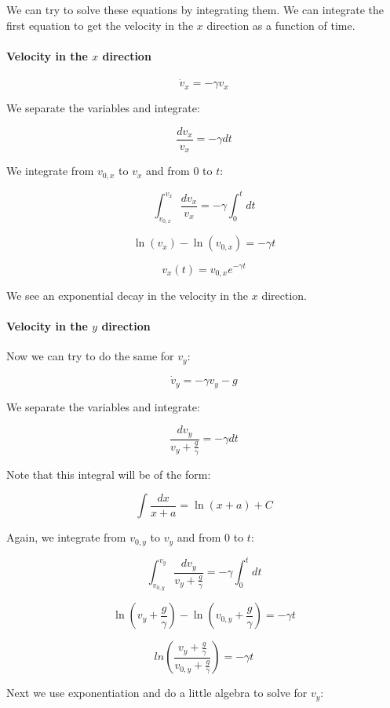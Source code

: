 \documentclass[11pt]{article}
\begin{document}
We can try to solve these equations by integrating them. We can
integrate the first equation to get the velocity in the \(x\) direction
as a function of time.

\paragraph{\texorpdfstring{Velocity in the \(x\)
direction}{Velocity in the x direction}}\label{velocity-in-the-x-direction}

\[\dot{v}_x = -\gamma v_x\]

We separate the variables and integrate:

\[\frac{dv_x}{v_x} = -\gamma dt\]

We integrate from \(v_{0,x}\) to \(v_x\) and from \(0\) to \(t\):

\[\int_{v_{0,x}}^{v_x} \frac{dv_x}{v_x} = -\gamma \int_{0}^{t} dt\]

\[\ln(v_x) - \ln(v_{0,x}) = -\gamma t\]

\[v_x(t) = v_{0,x} e^{-\gamma t}\]

We see an exponential decay in the velocity in the \(x\) direction.

\paragraph{\texorpdfstring{Velocity in the \(y\)
direction}{Velocity in the y direction}}\label{velocity-in-the-y-direction}

Now we can try to do the same for \(v_y\):

\[\dot{v}_y = -\gamma v_y - g\]

We separate the variables and integrate:

\[\frac{dv_y}{v_y + \frac{g}{\gamma}} = -\gamma dt\]

Note that this integral will be of the form:

\[\int \frac{dx}{x + a} = \ln(x + a) + C\]

Again, we integrate from \(v_{0,y}\) to \(v_y\) and from \(0\) to \(t\):

\[\int_{v_{0,y}}^{v_y} \frac{dv_y}{v_y + \frac{g}{\gamma}} = -\gamma \int_{0}^{t} dt\]

\[\ln(v_y + \frac{g}{\gamma}) - \ln(v_{0,y} + \frac{g}{\gamma}) = -\gamma t\]

\[ln\left(\dfrac{v_y + \frac{g}{\gamma}}{v_{0,y} + \frac{g}{\gamma}}\right) = -\gamma t\]

Next we use exponentiation and do a little algebra to solve for \(v_y\):
\end{document}
